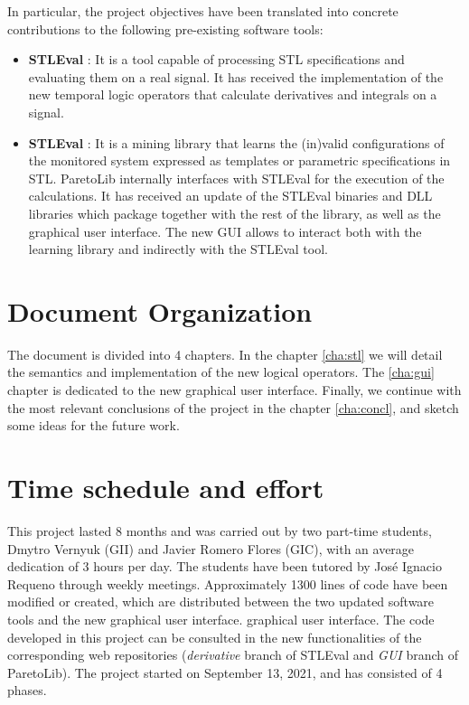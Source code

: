 In particular, the project objectives have been translated into concrete contributions to the following pre-existing software tools:

\begin{itemize}
\item \textbf{STLEval} \cite{StlEval}: It is a tool capable of processing STL specifications and evaluating them on a real signal. It has received the implementation of the new temporal logic operators that calculate derivatives and integrals on a signal.
\item \textbf{STLEval} \cite{StlEval}: It is a mining library that learns the (in)valid configurations of the monitored system expressed as templates or parametric specifications in STL.
ParetoLib internally interfaces with STLEval for the execution of the calculations. It has received an update of the STLEval binaries and DLL libraries which package together with the rest of the library, as well as the graphical user interface. The new GUI allows to interact both with the learning library and indirectly with the STLEval tool.
\end{itemize}

\section{Document Organization}

The document is divided into 4 chapters. In the chapter \ref{cha:stl} we will detail the semantics and implementation of the new logical operators. The \ref{cha:gui} chapter is dedicated to the new graphical user interface. Finally, we continue with the most relevant conclusions of the project in the chapter \ref{cha:concl}, and sketch some ideas for the future work. %

\section{Time schedule and effort}
This project lasted 8 months and was carried out by two part-time students, Dmytro Vernyuk (GII) and Javier Romero Flores (GIC), with an average dedication of 3 hours per day. The students have been tutored by José Ignacio Requeno through weekly meetings. Approximately 1300 lines of code have been modified or created, which are distributed between the two updated software tools and the new graphical user interface.
graphical user interface. The code developed in this project can be consulted in the new functionalities of the corresponding web repositories (\textit{derivative} branch of STLEval and \textit{GUI} branch of ParetoLib). The project started on September 13, 2021, and has consisted of 4 phases.


